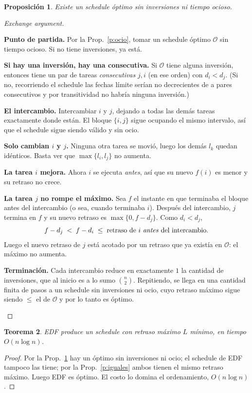 \documentclass[11pt,a4paper]{article}
\theoremstyle{plain}
\newtheorem{teorema}{Teorema}[section]
\newtheorem{proposicion}[teorema]{Proposición}
\theoremstyle{definition}
\theoremstyle{remark}
\begin{document}
\begin{proposicion}\label{p:intercambio}
Existe un schedule óptimo sin inversiones ni tiempo ocioso.
\end{proposicion}
\begin{proof}[Exchange argument]
\begin{pasos}
\item \textbf{Punto de partida.} Por la Prop.~\ref{p:ocio}, tomar un schedule óptimo
$\mathcal{O}$ sin tiempo ocioso. Si no tiene inversiones, ya está.
\item \textbf{Si hay una inversión, hay una consecutiva.} Si $\mathcal{O}$ tiene alguna
inversión, entonces tiene un par de tareas \emph{consecutivas} $j,i$ (en ese orden) con
$d_i<d_j$. (Si no, recorriendo el schedule las fechas límite serían no decrecientes de a
pares consecutivos y por transitividad no habría ninguna inversión.)
\item \textbf{El intercambio.} Intercambiar $i$ y $j$, dejando a todas las demás tareas
exactamente donde están. El bloque $\{i,j\}$ sigue ocupando el mismo intervalo, así que
el schedule sigue siendo válido y sin ocio.
\item \textbf{Solo cambian $i$ y $j$.} Ninguna otra tarea se movió, luego los demás
$l_k$ quedan idénticos. Basta ver que $\max\{l_i,l_j\}$ no aumenta.
\item \textbf{La tarea $i$ mejora.} Ahora $i$ se ejecuta \emph{antes}, así que su nuevo
$f(i)$ es menor y su retraso no crece.
\item \textbf{La tarea $j$ no rompe el máximo.} Sea $f$ el instante en que terminaba el
bloque antes del intercambio (o sea, cuando terminaba $i$). Después del intercambio, $j$
termina en $f$ y su nuevo retraso es $\max\{0,f-d_j\}$. Como $d_i<d_j$,
\[ f-d_j \;<\; f-d_i \;\le\; \text{retraso de } i \text{ \emph{antes} del intercambio}. \]
Luego el nuevo retraso de $j$ está acotado por un retraso que ya existía en
$\mathcal{O}$: el máximo no aumenta.
\item \textbf{Terminación.} Cada intercambio reduce en exactamente $1$ la cantidad de
inversiones, que al inicio es a lo sumo $\binom{n}{2}$. Repitiendo, se llega en una
cantidad finita de pasos a un schedule sin inversiones ni ocio, cuyo retraso máximo
sigue siendo $\le$ el de $\mathcal{O}$ y por lo tanto es óptimo. \qedhere
\end{pasos}
\end{proof}

\begin{teorema}
EDF produce un schedule con retraso máximo $L$ mínimo, en tiempo $O(n\log n)$.
\end{teorema}
\begin{proof}
Por la Prop.~\ref{p:intercambio} hay un óptimo sin inversiones ni ocio; el schedule de
EDF tampoco las tiene; por la Prop.~\ref{p:iguales} ambos tienen el mismo retraso
máximo. Luego EDF es óptimo. El costo lo domina el ordenamiento, $O(n\log n)$.
\end{proof}
\end{document}
